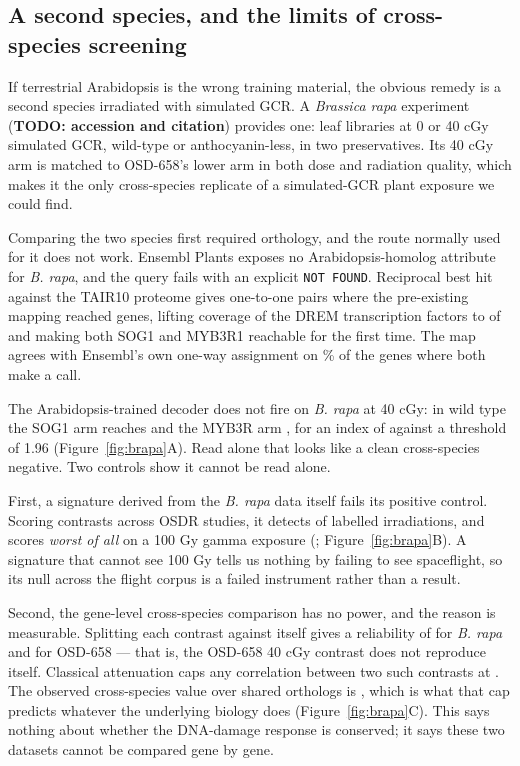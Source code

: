 \subsection{A second species, and the limits of cross-species screening}

If terrestrial Arabidopsis is the wrong training material, the obvious remedy is a second
species irradiated with simulated GCR. A \textit{Brassica rapa} experiment
(\textbf{TODO: accession and citation}) provides one:
\BrapaNLibraries{} leaf libraries at 0 or 40 cGy simulated GCR, wild-type or
anthocyanin-less, in two preservatives. Its 40 cGy arm is matched to OSD-658's lower arm in
both dose and radiation quality, which makes it the only cross-species replicate of a
simulated-GCR plant exposure we could find.

Comparing the two species first required orthology, and the route normally used for it does
not work. Ensembl Plants exposes no Arabidopsis-homolog attribute for \textit{B. rapa}, and
the query fails with an explicit \texttt{NOT FOUND}. Reciprocal best hit against the TAIR10
proteome gives \BrapaRbhPairs{} one-to-one pairs where the pre-existing mapping reached
\BrapaBiomartGenes{} genes, lifting coverage of the DREM transcription factors to
\BrapaTfMapped{} of \BrapaTfTotal{} and making both SOG1 and MYB3R1 reachable for the first
time. The map agrees with Ensembl's own one-way assignment on \BrapaEnsemblAgree{}\% of the
genes where both make a call.

The Arabidopsis-trained decoder does not fire on \textit{B. rapa} at 40 cGy: in wild type
the SOG1 arm reaches \BrapaWtSog{} and the MYB3R arm \BrapaWtMyb{}, for an index of
\BrapaWtIndex{} against a threshold of 1.96 (Figure~\ref{fig:brapa}A). Read alone that
looks like a clean cross-species negative. Two controls show it cannot be read alone.

First, a signature derived from the \textit{B. rapa} data itself fails its positive
control. Scoring \BrapaScreenContrasts{} contrasts across \BrapaScreenStudies{} OSDR
studies, it detects \BrapaPosCtrlDetected{} of \BrapaPosCtrlTotal{} labelled irradiations,
and scores \emph{worst of all} on a 100 Gy gamma exposure (\BrapaPosCtrlWorst{};
Figure~\ref{fig:brapa}B). A signature that cannot see 100 Gy tells us nothing by failing to
see spaceflight, so its null across the flight corpus is a failed instrument rather than a
result.

Second, the gene-level cross-species comparison has no power, and the reason is
measurable. Splitting each contrast against itself gives a reliability of \BrapaRelBrapa{}
for \textit{B. rapa} and \BrapaRelOsd{} for OSD-658 --- that is, the OSD-658 40 cGy
contrast does not reproduce itself. Classical attenuation caps any correlation between two
such contrasts at \BrapaAttenCap{}. The observed cross-species value over
\BrapaSharedGenes{} shared orthologs is \BrapaCrossRho{}, which is what that cap predicts
whatever the underlying biology does (Figure~\ref{fig:brapa}C). This says nothing about
whether the DNA-damage response is conserved; it says these two datasets cannot be compared
gene by gene.

